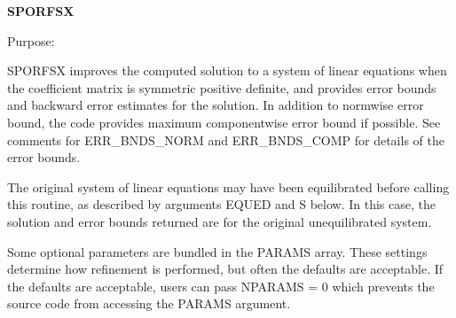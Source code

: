 {\bfseries S\+P\+O\+R\+F\+S\+X} 

 \begin{DoxyParagraph}{Purpose\+: }
\begin{DoxyVerb}    SPORFSX improves the computed solution to a system of linear
    equations when the coefficient matrix is symmetric positive
    definite, and provides error bounds and backward error estimates
    for the solution.  In addition to normwise error bound, the code
    provides maximum componentwise error bound if possible.  See
    comments for ERR_BNDS_NORM and ERR_BNDS_COMP for details of the
    error bounds.

    The original system of linear equations may have been equilibrated
    before calling this routine, as described by arguments EQUED and S
    below. In this case, the solution and error bounds returned are
    for the original unequilibrated system.\end{DoxyVerb}
 \begin{DoxyVerb}     Some optional parameters are bundled in the PARAMS array.  These
     settings determine how refinement is performed, but often the
     defaults are acceptable.  If the defaults are acceptable, users
     can pass NPARAMS = 0 which prevents the source code from accessing
     the PARAMS argument.\end{DoxyVerb}

\end{DoxyParagraph}

